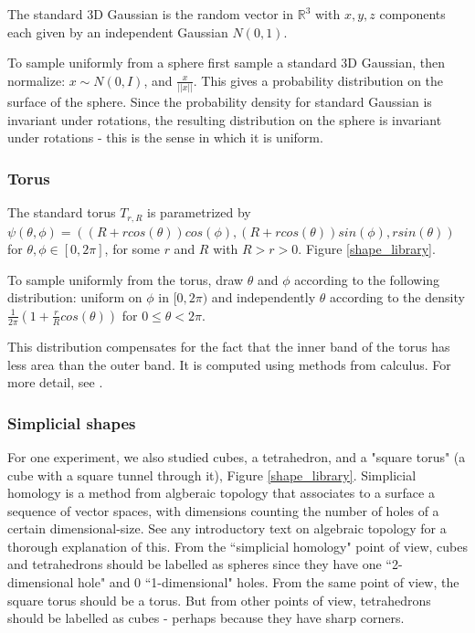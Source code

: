 \documentclass{article}
\begin{document}
The standard 3D Gaussian is the random vector in $\mathbb{R}^3$ with $x,y,z$ components each given by an independent Gaussian $N(0,1)$.

To sample uniformly from a sphere first sample a standard 3D Gaussian, then normalize: $x \sim N(0, I)$, and $\frac{x}{||x||}$. This gives a probability distribution on the surface of the sphere. Since the probability density for standard Gaussian is invariant under rotations, the resulting distribution on the sphere is invariant under rotations - this is the sense in which it is uniform.

\subsubsection{Torus}

The standard torus $T_{r,R}$ is parametrized by $\psi(\theta, \phi) = ((R + r cos(\theta))cos(\phi), (R + r cos (\theta))sin(\phi), r sin(\theta)) $ for $\theta, \phi \in [0, 2 \pi]$, for some $r$ and $R$ with $R > r > 0$. Figure \ref{shape_library}.

To sample uniformly from the torus, draw $\theta$ and $\phi$ according to the following distribution: uniform on $\phi$ in $[0, 2 \pi)$ and independently $\theta$ according to the density $\frac{1}{2 \pi}(1 + \frac{r}{R} cos(\theta))$ for $0 \leq \theta < 2 \pi$.

This distribution compensates for the fact that the inner band of the torus has less area than the outer band. It is computed using methods from calculus. For more detail, see \cite{diaconis}.

\subsubsection{Simplicial shapes}

For one experiment, we also studied cubes, a tetrahedron, and a "square torus" (a cube with a square tunnel through it), Figure \ref{shape_library}. Simplicial homology is a method from algberaic topology that associates to a surface a sequence of vector spaces, with dimensions counting the number of holes of a certain dimensional-size. See any introductory text on algebraic topology for a thorough explanation of this. From the ``simplicial homology" point of view, cubes and tetrahedrons should be labelled as spheres since they have one ``2-dimensional hole" and 0 ``1-dimensional" holes. From the same point of view, the square torus should be a torus. But from other points of view, tetrahedrons should be labelled as cubes - perhaps because they have sharp corners.
\end{document}
